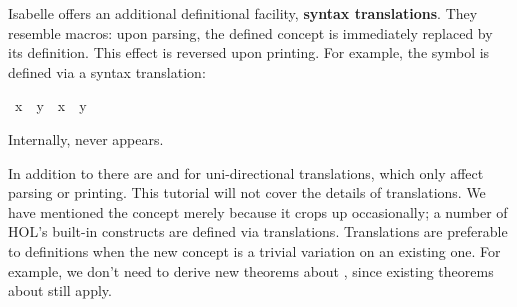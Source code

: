 %
\begin{isabellebody}%
\def\isabellecontext{Translations}%
\isamarkupfalse%
%
\isamarkuptrue%
%
\begin{isamarkuptext}%
\label{sec:def-translations}
%
Isabelle offers an additional definitional facility,
\textbf{syntax translations}.
They resemble macros: upon parsing, the defined concept is immediately
replaced by its definition.  This effect is reversed upon printing.  For example,
the symbol \isa{{\isasymnoteq}} is defined via a syntax translation:%
\end{isamarkuptext}%
\isamarkuptrue%
\ {\isachardoublequote}x\ {\isasymnoteq}\ y{\isachardoublequote}\ {\isasymrightleftharpoons}\ {\isachardoublequote}{\isasymnot}{\isacharparenleft}x\ {\isacharequal}\ y{\isacharparenright}{\isachardoublequote}\isamarkupfalse%
%
\begin{isamarkuptext}%
\noindent
Internally, \isa{{\isasymnoteq}} never appears.

In addition to \isa{{\isasymrightleftharpoons}} there are
\isa{{\isasymrightharpoonup}}
and \isa{{\isasymleftharpoondown}}
for uni-directional translations, which only affect
parsing or printing.  This tutorial will not cover the details of
translations.  We have mentioned the concept merely because it
crops up occasionally; a number of HOL's built-in constructs are defined
via translations.  Translations are preferable to definitions when the new 
concept is a trivial variation on an existing one.  For example, we
don't need to derive new theorems about \isa{{\isasymnoteq}}, since existing theorems
about \isa{{\isacharequal}} still apply.%
%
%
\end{isamarkuptext}%
\isamarkuptrue%
\isamarkupfalse%
\end{isabellebody}%
